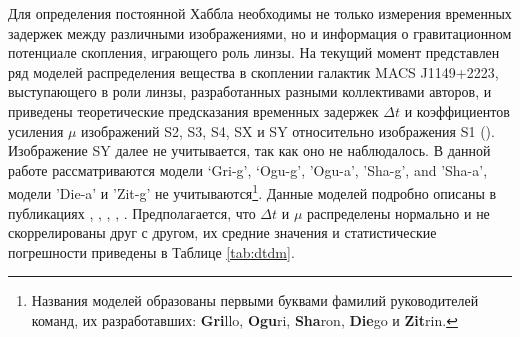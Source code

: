 Для определения постоянной Хаббла необходимы не только измерения временных задержек между различными изображениями, но и информация о гравитационном потенциале скопления, играющего роль линзы. На текущий момент представлен ряд моделей распределения вещества в скоплении галактик MACS J1149+2223, выступающего в роли линзы, разработанных разными коллективами авторов, и приведены теоретические предсказания временных задержек $\Delta t$ и коэффициентов усиления $\mu$ изображений S2, S3, S4, SX и SY относительно изображения S1 (\cite{treu2016}). Изображение SY далее не учитывается, так как оно не наблюдалось. В данной работе рассматриваются модели ‘Gri-g’, ‘Ogu-g’, ’Ogu-a’, ’Sha-g’, and ’Sha-a’, модели 'Die-a' и 'Zit-g' не учитываются\footnote{Названия моделей образованы первыми буквами фамилий руководителей команд, их разработавших: \textbf{Gri}llo, \textbf{Ogu}ri, \textbf{Sha}ron, \textbf{Die}go и \textbf{Zit}rin.}. Данные моделей подробно описаны в публикациях \cite{model_die}, \cite{model_gri}, \cite{model_ogu}, \cite{model_sha}, \cite{model_zit}. Предполагается, что $\Delta t$ и $\mu$ распределены нормально и не скоррелированы друг с другом, их средние значения и статистические погрешности приведены в Таблице \ref{tab:dtdm}.

\begin{table}[H]
 \caption{Рассматриваемые в этой работе временные задержки (в днях) и относительные усиления между изображениями SN Refsdal, предсказанные различными моделями распределения вещества \mbox{в скоплении галактик MACS J1149+2223 (\cite{treu2016}, Табл. 6).}}
 \label{tab:dtdm}
 \centering
\end{table}

